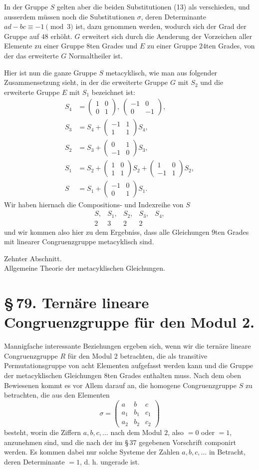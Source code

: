 \documentclass[11pt]{article}
\providecommand{\mat}[4]{\begin{pmatrix}#1&#2\\#3&#4\end{pmatrix}}
\providecommand{\mmat}[9]{\begin{pmatrix}#1&#2&#3\\#4&#5&#6\\#7&#8&#9\end{pmatrix}}
\providecommand{\mat}[4]{\begin{pmatrix}#1&#2\\#3&#4\end{pmatrix}}
\providecommand{\mmat}[9]{\begin{pmatrix}#1&#2&#3\\#4&#5&#6\\#7&#8&#9\end{pmatrix}}
\begin{document}
In der Gruppe $S$ gelten aber die beiden Substitutionen (13) als verschieden, und ausserdem müssen noch die Substitutionen $\sigma$, deren Determinante $ad-bc\equiv -1\pmod 3$ ist, dazu genommen werden, wodurch sich der Grad der Gruppe auf $48$ erhöht. $G$ erweitert sich durch die Aenderung der Vorzeichen aller Elemente zu einer Gruppe $8$ten Grades und $E$ zu einer Gruppe $24$ten Grades, von der das erweiterte $G$ Normaltheiler ist.

Hier ist nun die ganze Gruppe $S$ metacyklisch, wie man aus folgender Zusammensetzung sieht, in der die erweiterte Gruppe $G$ mit $S_2$ und die erweiterte Gruppe $E$ mit $S_1$ bezeichnet ist:
\begin{align*}
 S_4&=\mat{1}{0}{0}{1},\ \mat{-1}{0}{0}{-1},\\
 S_3&=S_4+\mat{-1}{1}{1}{1}S_4,\\
 S_2&=S_3+\mat{0}{1}{-1}{0}S_3,\\
 S_1&=S_2+\mat{1}{0}{1}{1}S_2+\mat{1}{0}{-1}{1}S_2,\\
 S&=S_1+\mat{-1}{0}{0}{1}S_1.
\end{align*}
Wir haben hiernach die Compositions- und Indexreihe von $S$
\[
 \begin{array}{ccccc}
 S,&S_1,&S_2,&S_3,&S_4,\\
 2&3&2&2&
 \end{array}
\]
und wir kommen also hier zu dem Ergebniss, dass alle Gleichungen $9$ten Grades mit linearer Congruenzgruppe metacyklisch sind.




\begin{center}
{\large Zehnter Abschnitt.}\\[0.4em]
{\large Allgemeine Theorie der metacyklischen Gleichungen.}
\end{center}

\section*{\S\,79. Ternäre lineare Congruenzgruppe für den Modul 2.}

Mannigfache interessante Beziehungen ergeben sich, wenn wir die ternäre lineare Congruenzgruppe $R$ für den Modul $2$ betrachten, die als transitive Permutationsgruppe von acht Elementen aufgefasst werden kann und die Gruppe der metacyklischen Gleichungen $8$ten Grades enthalten muss. Nach dem oben Bewiesenen kommt es vor Allem darauf an, die homogene Congruenzgruppe $S$ zu betrachten, die aus den Elementen
\begin{equation}
 \sigma=\mmat{a}{b}{c}{a_1}{b_1}{c_1}{a_2}{b_2}{c_2}
 \tag{1}
\end{equation}
besteht, worin die Ziffern $a,b,c,\ldots$ nach dem Modul $2$, also $=0$ oder $=1$, anzunehmen sind, und die nach der im \S\,37 gegebenen Vorschrift componirt werden. Es kommen dabei nur solche Systeme der Zahlen $a,b,c,\ldots$ in Betracht, deren Determinante $=1$, d. h. ungerade ist.
\end{document}
